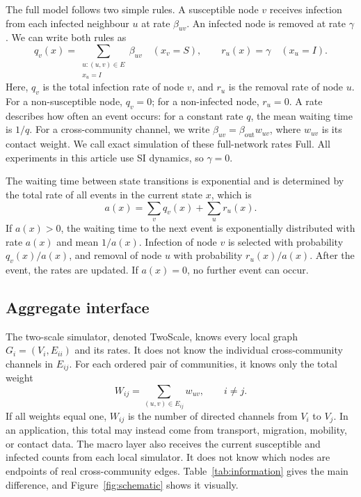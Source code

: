 \documentclass{ieeeaccess}
\newcommand{\Full}{\textup{Full}}
\newcommand{\TS}{\textup{TwoScale}}
\begin{document}
The full model follows two simple rules. A susceptible node $v$ receives infection from each infected neighbour $u$ at rate $\beta_{uv}$. An infected node is removed at rate $\gamma$. We can write both rules as
\begin{equation}
\label{eq:full_generator}
q_v(x)=\sum_{\substack{u:(u,v)\in E\\x_u=I}}\beta_{uv}
\quad (x_v=S),
\qquad r_u(x)=\gamma\quad (x_u=I).
\end{equation}
Here, $q_v$ is the total infection rate of node $v$, and $r_u$ is the removal rate of node $u$. For a non-susceptible node, $q_v=0$; for a non-infected node, $r_u=0$. A rate describes how often an event occurs: for a constant rate $q$, the mean waiting time is $1/q$. For a cross-community channel, we write $\beta_{uv}=\beta_{\mathrm{out}}w_{uv}$, where $w_{uv}$ is its contact weight. We call exact simulation of these full-network rates \Full{}. All experiments in this article use SI dynamics, so $\gamma=0$.

The waiting time between state transitions is exponential and is determined by the total rate of all events in the current state $x$, which is
\[
a(x)=\sum_v q_v(x)+\sum_u r_u(x).
\]
If $a(x)>0$, the waiting time to the next event is exponentially distributed with rate $a(x)$ and mean $1/a(x)$. Infection of node $v$ is selected with probability $q_v(x)/a(x)$, and removal of node $u$ with probability $r_u(x)/a(x)$. After the event, the rates are updated. If $a(x)=0$, no further event can occur.

\subsection{Aggregate interface}
\label{sec:interface}

The two-scale simulator, denoted \TS{}, knows every local graph $G_i=(V_i,E_{ii})$ and its rates. It does not know the individual cross-community channels in $E_{ij}$. For each ordered pair of communities, it knows only the total weight
\begin{equation}
\label{eq:weight}
W_{ij}=\sum_{(u,v)\in E_{ij}}w_{uv},
\qquad i\neq j.
\end{equation}
If all weights equal one, $W_{ij}$ is the number of directed channels from $V_i$ to $V_j$. In an application, this total may instead come from transport, migration, mobility, or contact data. The macro layer also receives the current susceptible and infected counts from each local simulator. It does not know which nodes are endpoints of real cross-community edges. Table~\ref{tab:information} gives the main difference, and Figure~\ref{fig:schematic} shows it visually.
\end{document}
